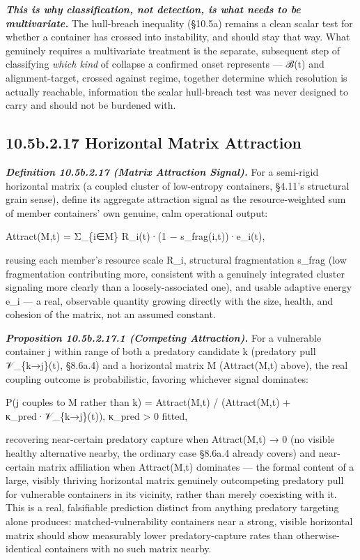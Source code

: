 \documentclass[
]{article}
\begin{document}
\emph{\textbf{This is why classification, not detection, is what needs
to be multivariate.}} The hull-breach inequality (§10.5a) remains a
clean scalar test for whether a container has crossed into instability,
and should stay that way. What genuinely requires a multivariate
treatment is the separate, subsequent step of classifying \emph{which
kind} of collapse a confirmed onset represents --- ℬ(t) and
alignment-target, crossed against regime, together determine which
resolution is actually reachable, information the scalar hull-breach
test was never designed to carry and should not be burdened with.

\hypertarget{b.2.17-horizontal-matrix-attraction}{%
\subsection{10.5b.2.17 Horizontal Matrix
Attraction}\label{b.2.17-horizontal-matrix-attraction}}

\emph{\textbf{Definition 10.5b.2.17 (Matrix Attraction Signal).}} For a
semi-rigid horizontal matrix (a coupled cluster of low-entropy
containers, §4.11's structural grain sense), define its aggregate
attraction signal as the resource-weighted sum of member containers' own
genuine, calm operational output:

Attract(M,t) = Σ\_\{i∈M\} R\_i(t)·(1 − s\_frag(i,t))·e\_i(t),

reusing each member's resource scale R\_i, structural fragmentation
s\_frag (low fragmentation contributing more, consistent with a
genuinely integrated cluster signaling more clearly than a
loosely-associated one), and usable adaptive energy e\_i --- a real,
observable quantity growing directly with the size, health, and cohesion
of the matrix, not an assumed constant.

\emph{\textbf{Proposition 10.5b.2.17.1 (Competing Attraction).}} For a
vulnerable container j within range of both a predatory candidate k
(predatory pull 𝒱\_\{k→j\}(t), §8.6a.4) and a horizontal matrix M
(Attract(M,t) above), the real coupling outcome is probabilistic,
favoring whichever signal dominates:

P(j couples to M rather than k) = Attract(M,t) / (Attract(M,t) +
κ\_pred·𝒱\_\{k→j\}(t)), κ\_pred \textgreater{} 0 fitted,

recovering near-certain predatory capture when Attract(M,t) → 0 (no
visible healthy alternative nearby, the ordinary case §8.6a.4 already
covers) and near-certain matrix affiliation when Attract(M,t) dominates
--- the formal content of a large, visibly thriving horizontal matrix
genuinely outcompeting predatory pull for vulnerable containers in its
vicinity, rather than merely coexisting with it. This is a real,
falsifiable prediction distinct from anything predatory targeting alone
produces: matched-vulnerability containers near a strong, visible
horizontal matrix should show measurably lower predatory-capture rates
than otherwise-identical containers with no such matrix nearby.
\end{document}
